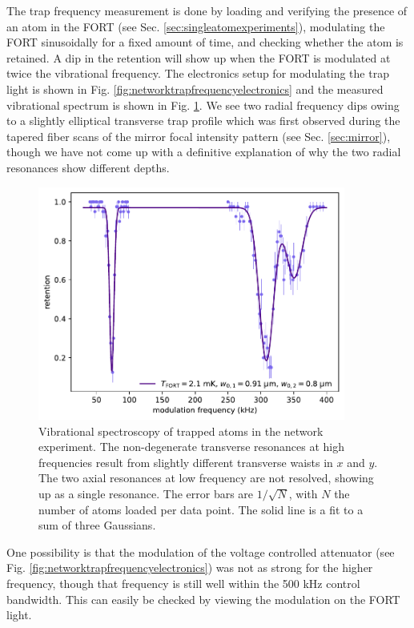 The trap frequency measurement is done by loading and verifying the presence of an atom in the FORT (see Sec. \ref{sec:singleatomexperiments}), modulating the FORT sinusoidally for a fixed amount of time, and checking whether the atom is retained. A dip in the retention will show up when the FORT is modulated at twice the vibrational frequency. The electronics setup for modulating the trap light is shown in Fig. \ref{fig:networktrapfrequencyelectronics} and the measured vibrational spectrum is shown in Fig. \ref{fig:networktrapfrequencies}. We see two radial frequency dips owing to a slightly elliptical transverse trap profile which was first observed during the tapered fiber scans of the mirror focal intensity pattern (see Sec. \ref{sec:mirror}), though we have not come up with a definitive explanation of why the two radial resonances show different depths. 
\begin{figure}[!ht]
    \centering
    \includegraphics[width=0.9\textwidth]{Images/trap_frequency_experiment 15450.pdf}
    \caption{Vibrational spectroscopy of trapped atoms in the network experiment. The non-degenerate transverse resonances at high frequencies result from slightly different transverse waists in $x$ and $y$. The two axial resonances at low frequency are not resolved, showing up as a single resonance. The error bars are $1/\sqrt{N}$, with $N$ the number of atoms loaded per data point. The solid line is a fit to a sum of three Gaussians.}
    \label{fig:networktrapfrequencies}
\end{figure}
One possibility is that the modulation of the voltage controlled attenuator (see Fig. \ref{fig:networktrapfrequencyelectronics}) was not as strong for the higher frequency, though that frequency is still well within the 500 kHz control bandwidth. This can easily be checked by viewing the modulation on the FORT light.
    
